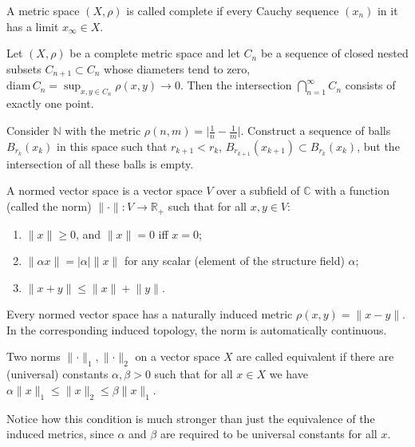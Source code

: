 \documentclass[english,letterpaper]{article}%
\numberwithin{equation}{section}
\numberwithin{figure}{section}
\numberwithin{table}{section}
\theoremstyle{definition}
\theoremstyle{definition}
\theoremstyle{definition}
\theoremstyle{plain}
\theoremstyle{plain}
\theoremstyle{plain}
\theoremstyle{plain}
\theoremstyle{remark}
\theoremstyle{remark}
\renewcommand{\geq}{\geqslant}
\renewcommand{\leq}{\leqslant}
\begin{document}
\begin{defn}[Completeness]
A metric space $(X,\rho)$ is called complete if every Cauchy sequence $(x_n)$ in it has a limit $x_\infty\in X$.
\end{defn}

\begin{thm}
Let $(X,\rho)$ be a complete metric space and let $C_n$ be a sequence of closed nested subsets $C_{n+1}\subset C_n$ whose diameters tend to zero, $\mathrm{diam}\,C_n=\sup_{x,y\in C_n} \rho(x,y) \to 0$. Then the intersection $\bigcap_{n=1}^\infty C_n$ consists of exactly one point.
\end{thm}

\begin{xca}
Consider $\mathbb{N}$ with the metric $\rho (n,m)=\lvert \frac 1 n-\frac 1 m\rvert$. Construct a sequence of balls $B_{r_k}(x_k)$ in this space such that $r_{k+1}<r_k$, $B_{r_{k+1}}(x_{k+1})\subset B_{r_k}(x_k)$, but the intersection of all these balls is empty.
\end{xca}
\begin{defn}
A normed vector space is a vector space $V$ over a subfield of $\mathbb{C}$ with a function (called the norm) $\lVert \cdot \rVert: V\to \mathbb R_+$ such that for all $x,y\in V$:
\begin{enumerate}
    \item $\lVert x\rVert\geq 0$, and $\lVert x\rVert= 0$ iff $x=0$;
    \item $\lVert \alpha  x\rVert=\lvert \alpha \rvert \lVert x\rVert$ for any scalar (element of the structure field) $\alpha$;
    \item $\lVert x+y\rVert\leq \lVert x\rVert+\lVert y\rVert$.
\end{enumerate}
Every normed vector space has a naturally induced metric $\rho (x,y)=\lVert x-y\rVert$. In the corresponding induced topology, the norm is automatically continuous.

\end{defn}
\begin{defn}
Two norms $\lVert\cdot \rVert_1,\lVert\cdot \rVert_2 $ on a vector space $X$ are called equivalent if there are (universal) constants $\alpha,\beta >0$ such that for all $x\in X$ we have $\alpha \lVert x \rVert_1\leq \lVert x \rVert_2 \leq \beta \lVert x \rVert_1$.
\end{defn}
Notice how this condition is much stronger than just the equivalence of the induced metrics, since $\alpha$ and $\beta$ are required to be universal constants for all $x$.
\end{document}
